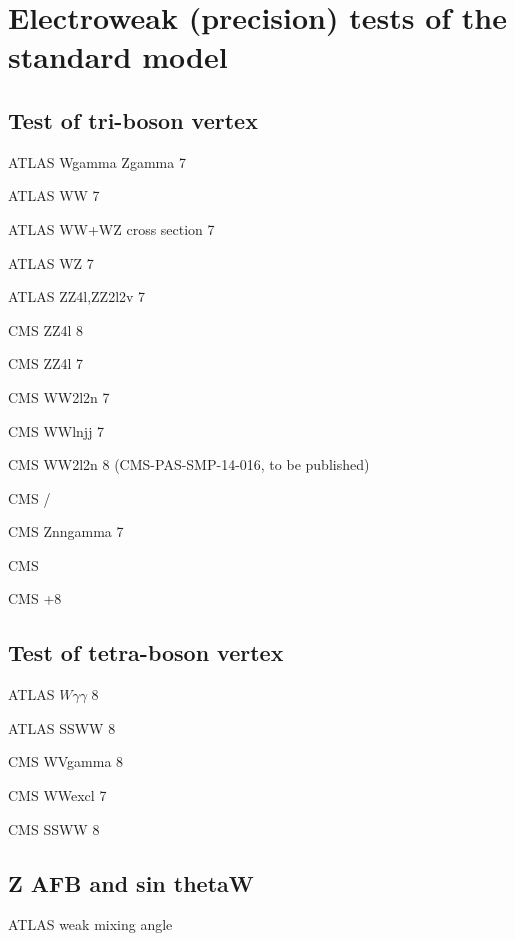 \documentclass[12pt]{iopart}
\begin{document}
\section{Electroweak (precision) tests of the standard model}
\subsection{Test of tri-boson vertex}

ATLAS Wgamma Zgamma 7 \TeV~\cite{Aad:2013izg}

ATLAS WW 7 \TeV~\cite{ATLAS:2012mec}

ATLAS WW+WZ cross section 7 \TeV~\cite{Aad:2014mda}

ATLAS WZ 7 \TeV~\cite{Aad:2012twa}

ATLAS ZZ4l,ZZ2l2v 7 \TeV~\cite{Aad:2012awa}

CMS ZZ4l 8 \TeV~\cite{Khachatryan:2014dia}

CMS ZZ4l 7 \TeV~\cite{Chatrchyan:2012sga}

CMS WW2l2n 7 \TeV~\cite{Chatrchyan:2013yaa}

CMS WWlnjj 7 \TeV~\cite{Chatrchyan:2012bd}

CMS WW2l2n 8 \TeV (CMS-PAS-SMP-14-016, to be published)

CMS \Wg/ \TeV~\cite{Chatrchyan:2013fya}

CMS Znngamma 7 \TeV~\cite{Chatrchyan:2013nda}

CMS  \TeV~\cite{Khachatryan:2015kea}

CMS +8 \TeV~\cite{Khachatryan:2015pba}

\subsection{Test of tetra-boson vertex}

ATLAS $W\gamma\gamma$ 8 \TeV~\cite{Aad:2015uqa}

ATLAS SSWW 8 \TeV~\cite{Aad:2014zda}

CMS WVgamma 8 \TeV~\cite{Chatrchyan:2014bza}

CMS WWexcl 7 \TeV~\cite{Chatrchyan:2013foa}

CMS SSWW 8 \TeV~\cite{Khachatryan:2014sta}

\subsection{Z AFB and sin thetaW}

ATLAS weak mixing angle~\cite{Aad:2015uau}
\end{document}
